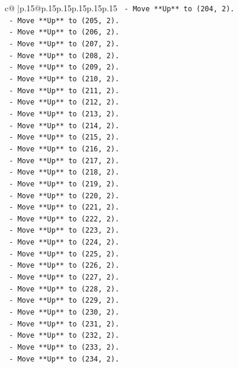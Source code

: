 \documentclass{article}
\begin{document}
{\begin{supertabular}{c@{$\;$}|p{.15\linewidth}@{}p{.15\linewidth}p{.15\linewidth}p{.15\linewidth}p{.15\linewidth}p{.15\linewidth}}
{{{\texttt{    {-} Move **Up** to (204, 2).} \\
\texttt{    {-} Move **Up** to (205, 2).} \\
\texttt{    {-} Move **Up** to (206, 2).} \\
\texttt{    {-} Move **Up** to (207, 2).} \\
\texttt{    {-} Move **Up** to (208, 2).} \\
\texttt{    {-} Move **Up** to (209, 2).} \\
\texttt{    {-} Move **Up** to (210, 2).} \\
\texttt{    {-} Move **Up** to (211, 2).} \\
\texttt{    {-} Move **Up** to (212, 2).} \\
\texttt{    {-} Move **Up** to (213, 2).} \\
\texttt{    {-} Move **Up** to (214, 2).} \\
\texttt{    {-} Move **Up** to (215, 2).} \\
\texttt{    {-} Move **Up** to (216, 2).} \\
\texttt{    {-} Move **Up** to (217, 2).} \\
\texttt{    {-} Move **Up** to (218, 2).} \\
\texttt{    {-} Move **Up** to (219, 2).} \\
\texttt{    {-} Move **Up** to (220, 2).} \\
\texttt{    {-} Move **Up** to (221, 2).} \\
\texttt{    {-} Move **Up** to (222, 2).} \\
\texttt{    {-} Move **Up** to (223, 2).} \\
\texttt{    {-} Move **Up** to (224, 2).} \\
\texttt{    {-} Move **Up** to (225, 2).} \\
\texttt{    {-} Move **Up** to (226, 2).} \\
\texttt{    {-} Move **Up** to (227, 2).} \\
\texttt{    {-} Move **Up** to (228, 2).} \\
\texttt{    {-} Move **Up** to (229, 2).} \\
\texttt{    {-} Move **Up** to (230, 2).} \\
\texttt{    {-} Move **Up** to (231, 2).} \\
\texttt{    {-} Move **Up** to (232, 2).} \\
\texttt{    {-} Move **Up** to (233, 2).} \\
\texttt{    {-} Move **Up** to (234, 2).} \\
}}}
\end{supertabular}}
\end{document}
